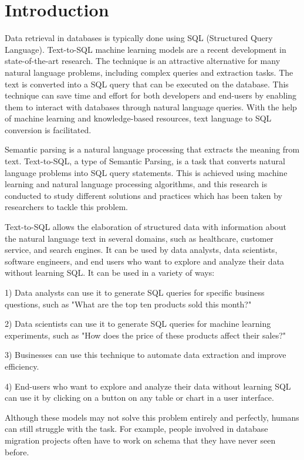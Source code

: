 \section{Introduction}

Data retrieval in databases is typically done using SQL (Structured Query Language). Text-to-SQL machine learning models are a recent development in state-of-the-art research. The technique is an attractive alternative for many natural language problems, including complex queries and extraction tasks. The text is converted into a SQL query that can be executed on the database. This technique can save time and effort for both developers and end-users by enabling them to interact with databases through natural language queries. With the help of machine learning and knowledge-based resources, text language to SQL conversion is facilitated.

Semantic parsing is a natural language processing that extracts the meaning from text. Text-to-SQL, a type of Semantic Parsing, is a task that converts natural language problems into SQL query statements.
This is achieved using machine learning and natural language processing algorithms, and this research is conducted to study different solutions and practices which has been taken by researchers to tackle this problem.

Text-to-SQL allows the elaboration of structured data with information about the natural language text in several domains, such as healthcare, customer service, and search engines. It can be used by data analysts, data scientists, software engineers, and end users who want to explore and analyze their data without learning SQL.
It can be used in a variety of ways:

1) Data analysts can use it to generate SQL queries for specific business questions, such as "What are the top ten products sold this month?"

2) Data scientists can use it to generate SQL queries for machine learning experiments, such as "How does the price of these products affect their sales?"

3) Businesses can use this technique to automate data extraction and improve efficiency.

4) End-users who want to explore and analyze their data without learning SQL can use it by clicking on a button on any table or chart in a user interface.

Although these models may not solve this problem entirely and perfectly, humans can still struggle with the task. For example, people involved in database migration projects often have to work on schema that they have never seen before.

